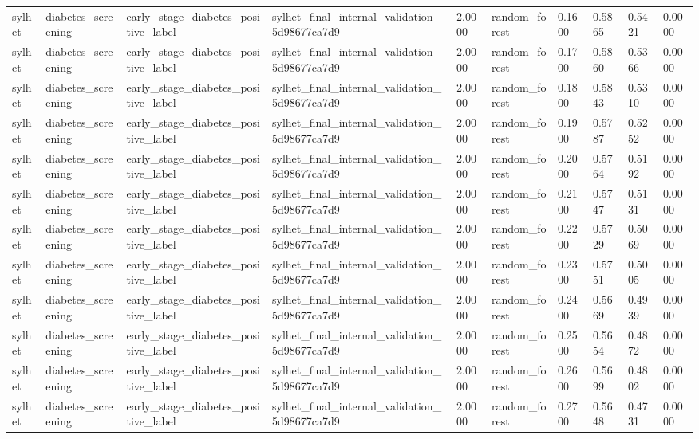 \begin{tabular}{llllllllll}
sylhet & diabetes\_screening & early\_stage\_diabetes\_positive\_label & sylhet\_final\_internal\_validation\_5d98677ca7d9 & 2.0000 & random\_forest & 0.1600 & 0.5865 & 0.5421 & 0.0000 \\
sylhet & diabetes\_screening & early\_stage\_diabetes\_positive\_label & sylhet\_final\_internal\_validation\_5d98677ca7d9 & 2.0000 & random\_forest & 0.1700 & 0.5860 & 0.5366 & 0.0000 \\
sylhet & diabetes\_screening & early\_stage\_diabetes\_positive\_label & sylhet\_final\_internal\_validation\_5d98677ca7d9 & 2.0000 & random\_forest & 0.1800 & 0.5843 & 0.5310 & 0.0000 \\
sylhet & diabetes\_screening & early\_stage\_diabetes\_positive\_label & sylhet\_final\_internal\_validation\_5d98677ca7d9 & 2.0000 & random\_forest & 0.1900 & 0.5787 & 0.5252 & 0.0000 \\
sylhet & diabetes\_screening & early\_stage\_diabetes\_positive\_label & sylhet\_final\_internal\_validation\_5d98677ca7d9 & 2.0000 & random\_forest & 0.2000 & 0.5764 & 0.5192 & 0.0000 \\
sylhet & diabetes\_screening & early\_stage\_diabetes\_positive\_label & sylhet\_final\_internal\_validation\_5d98677ca7d9 & 2.0000 & random\_forest & 0.2100 & 0.5747 & 0.5131 & 0.0000 \\
sylhet & diabetes\_screening & early\_stage\_diabetes\_positive\_label & sylhet\_final\_internal\_validation\_5d98677ca7d9 & 2.0000 & random\_forest & 0.2200 & 0.5729 & 0.5069 & 0.0000 \\
sylhet & diabetes\_screening & early\_stage\_diabetes\_positive\_label & sylhet\_final\_internal\_validation\_5d98677ca7d9 & 2.0000 & random\_forest & 0.2300 & 0.5751 & 0.5005 & 0.0000 \\
sylhet & diabetes\_screening & early\_stage\_diabetes\_positive\_label & sylhet\_final\_internal\_validation\_5d98677ca7d9 & 2.0000 & random\_forest & 0.2400 & 0.5669 & 0.4939 & 0.0000 \\
sylhet & diabetes\_screening & early\_stage\_diabetes\_positive\_label & sylhet\_final\_internal\_validation\_5d98677ca7d9 & 2.0000 & random\_forest & 0.2500 & 0.5654 & 0.4872 & 0.0000 \\
sylhet & diabetes\_screening & early\_stage\_diabetes\_positive\_label & sylhet\_final\_internal\_validation\_5d98677ca7d9 & 2.0000 & random\_forest & 0.2600 & 0.5699 & 0.4802 & 0.0000 \\
sylhet & diabetes\_screening & early\_stage\_diabetes\_positive\_label & sylhet\_final\_internal\_validation\_5d98677ca7d9 & 2.0000 & random\_forest & 0.2700 & 0.5648 & 0.4731 & 0.0000 \\

\end{tabular}
